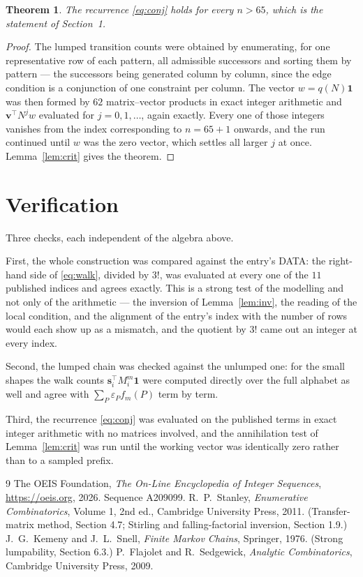 \documentclass[11pt,a4paper]{article}
\theoremstyle{plain}
\newtheorem{theorem}{Theorem}
\theoremstyle{definition}
\begin{document}
\begin{theorem}
The recurrence \eqref{eq:conj} holds for every $n>65$, which is the statement of
Section~1.
\end{theorem}

\begin{proof}
The lumped transition counts were obtained by enumerating, for one representative row of
each pattern, all admissible successors and sorting them by pattern --- the successors being
generated column by column, since the edge condition is a conjunction of one constraint per
column. The vector $w=q(N)\mathbf{1}$ was then formed by $62$ matrix--vector products
in exact integer arithmetic and $\mathbf{v}^{\!\top}N^{j}w$ evaluated for
$j=0,1,\dots$, again exactly. Every one of those integers vanishes from the index
corresponding to $n=65+1$ onwards, and the run continued until $w$ was the zero vector,
which settles all larger $j$ at once. Lemma~\ref{lem:crit} gives the theorem.
\end{proof}

\section{Verification}

Three checks, each independent of the algebra above.

First, the whole construction was compared against the entry's DATA: the right-hand side of
\eqref{eq:walk}, divided by $3!$, was evaluated at every one of the $11$
published indices and agrees exactly. This is a strong test of the modelling and not only of
the arithmetic --- the inversion of Lemma~\ref{lem:inv}, the reading of the local
condition, and the alignment of the entry's index with the number of rows would each
show up as a mismatch, and the quotient by $3!$ came out an integer at every index.

Second, the lumped chain was checked against the unlumped one: for the small shapes the walk
counts $\mathbf{s}_i^{\!\top}M_i^{m}\mathbf{1}$ were computed directly over the full
alphabet as well and agree with $\sum_P\varepsilon_Pf_m(P)$ term by term.

Third, the recurrence \eqref{eq:conj} was evaluated on the published terms in exact integer
arithmetic with no matrices involved, and the annihilation test of Lemma~\ref{lem:crit} was
run until the working vector was identically zero rather than to a sampled prefix.

\begin{thebibliography}{9}
 The OEIS Foundation, \emph{The On-Line Encyclopedia of Integer
Sequences}, \url{https://oeis.org}, 2026. Sequence A209099.
 R.~P.~Stanley, \emph{Enumerative Combinatorics}, Volume 1, 2nd ed.,
Cambridge University Press, 2011. (Transfer-matrix method, Section 4.7; Stirling and
falling-factorial inversion, Section 1.9.)
 J.~G.~Kemeny and J.~L.~Snell, \emph{Finite Markov Chains}, Springer,
1976. (Strong lumpability, Section 6.3.)
 P.~Flajolet and R.~Sedgewick, \emph{Analytic Combinatorics}, Cambridge
University Press, 2009.
\end{thebibliography}
\end{document}
